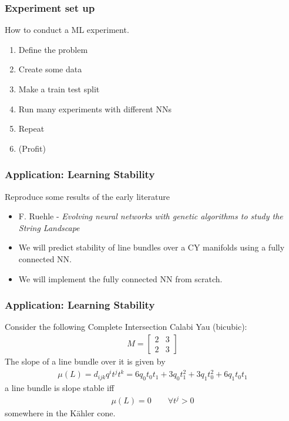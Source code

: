 \documentclass{beamer}
\begin{document}
\begin{frame}
\frametitle{Experiment set up}
How to conduct a ML experiment.
\begin{enumerate}
	\item Define the problem
	\pause
	\item Create some data
	\pause
	\item Make a train test split
	\pause
	\item Run many experiments with different NNs
	\pause
	\item Repeat
	\item (Profit)
\end{enumerate}
\end{frame}


\begin{frame}
\frametitle{Application: Learning Stability}
Reproduce some results of the early literature
\begin{itemize}
	\item F. Ruehle - {\it Evolving neural networks with genetic algorithms to study the String Landscape}
	\item We will predict stability of line bundles over a CY manifolds using a fully connected NN.
	\item We will implement the fully connected NN from scratch.
\end{itemize}
\end{frame}

\begin{frame}
\frametitle{Application: Learning Stability}
Consider the following Complete Intersection Calabi Yau (bicubic):
\begin{align}
M = \left[
\begin{array}{c||c}
2 & 3\\
2 & 3
\end{array}
\right]
\end{align}
The slope of a line bundle over it is given by
\begin{align}
\mu(L) = d_{ijk} q^i t^j t^k = 6q_0t_0t_1 + 3q_0t_1^2 + 3q_1t_0^2 + 6q_1t_0t_1
\end{align}
a line bundle is slope stable iff
\begin{align}
	\mu(L) = 0\qquad \forall t^j > 0
\end{align}
somewhere in the Kähler cone.
\end{frame}
\end{document}
